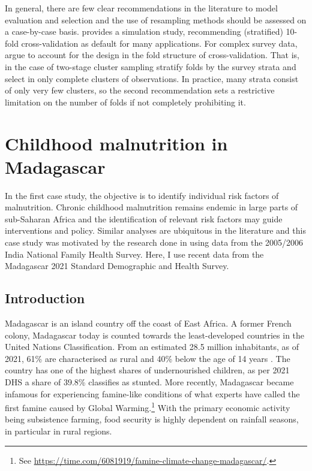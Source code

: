 In general, there are few clear recommendations in the literature to model evaluation and selection and the use of resampling methods should be assessed on a case-by-case basis. \textcite{kohaviStudyCrossValidationBootstrap1995} provides a simulation study, recommending (stratified) 10-fold cross-validation as default for many applications. For complex survey data, \textcite{wieczorekKfoldCrossvalidationComplex2022} argue to account for the design in the fold structure of cross-validation. That is, in the case of two-stage cluster sampling stratify folds by the survey strata and select in only complete clusters of observations. In practice, many strata consist of only very few clusters, so the second recommendation sets a restrictive limitation on the number of folds if not completely prohibiting it. 



\section{Childhood malnutrition in Madagascar}\label{sec:childhood-malnutrition-in-madagascar}

In the first case study, the objective is to identify individual risk factors of malnutrition. Chronic childhood malnutrition remains endemic in large parts of sub-Saharan Africa \autocite{roserHungerUndernourishment2019} and the identification of relevant risk factors may guide interventions and policy. Similar analyses are ubiquitous in the literature and this case study was motivated by the research done in \textcite{fenskeIdentifyingRiskFactors2011, fenskeUnderstandingChildStunting2013} using data from the 2005/2006 India National Family Health Survey. Here, I use recent data from the Madagascar 2021 Standard Demographic and Health Survey. 


\subsection{Introduction}

Madagascar is an island country off the coast of East Africa. A former French colony, Madagascar today is counted towards the least-developed countries in the United Nations Classification. From an estimated 28.5 million inhabitants, as of 2021, 61\% are characterised as rural and 40\% below the age of 14 years \autocite{worldbankDataBank2022}. The country has one of the highest shares of undernourished children, as per 2021 DHS a share of 39.8\% classifies as stunted. More recently, Madagascar became infamous for experiencing famine-like conditions of what experts have called the first famine caused by Global Warming.\footnote{See \url{https://time.com/6081919/famine-climate-change-madagascar/}.} With the primary economic activity being subsistence farming, food security is highly dependent on rainfall seasons, in particular in rural regions. 

